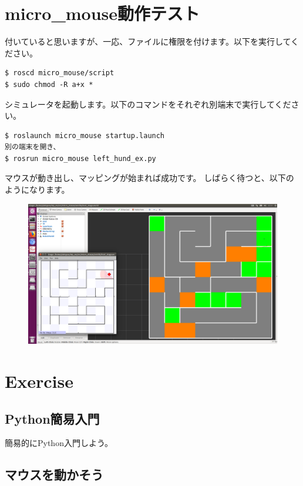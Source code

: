 \documentclass[11pt,a4paper]{jsarticle}
\begin{document}
\section{micro\_mouse動作テスト}
付いていると思いますが、一応、ファイルに権限を付けます。以下を実行してください。
\begin{lstlisting}[frame=single, caption=roscd, label=roscd]
$ roscd micro_mouse/script
$ sudo chmod -R a+x *
\end{lstlisting}

シミュレータを起動します。以下のコマンドをそれぞれ別端末で実行してください。
\begin{lstlisting}[frame=single, caption=roscd, label=roscd]
$ roslaunch micro_mouse startup.launch
別の端末を開き、
$ rosrun micro_mouse left_hund_ex.py
\end{lstlisting}


マウスが動き出し、マッピングが始まれば成功です。
しばらく待つと、以下のようになります。
\begin{figure}[h]
  \begin{center}
    \includegraphics[width=128mm]{./mms_test.png}
  \end{center}
  \caption{}
  \label{graph3}
\end{figure}




\section{Exercise}
\subsection{Python簡易入門}
簡易的にPython入門しよう。

\newpage
\subsection{マウスを動かそう}
\end{document}
